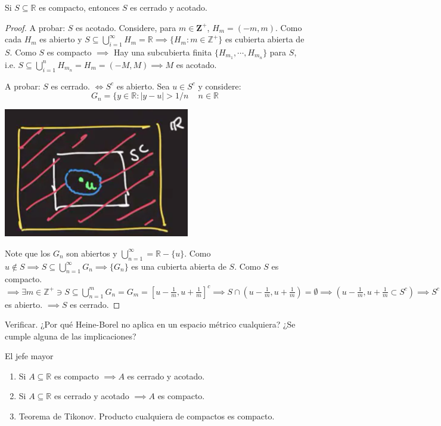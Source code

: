 \begin{teorema}
	Si $S\subseteq \mathbb{R}$ es compacto, entonces $S$ es cerrado y acotado. 
	\begin{proof}
		A probar: $S$ es acotado. Considere, para $m\in \mathbf{Z}^+$, $H_m=(-m,m)$. Como cada $H_m$ es abierto y $S\subseteq \bigcup_{i=1}^\infty H_m=\mathbb{R}\implies \{H_m:m\in\mathbb{Z}^+\}$ es cubierta abierta de $S$. Como $S$ es compacto $\implies$ Hay una subcubierta finita $\{H_{m_1},\cdots, H_{m_n}\}$ para $S$, i.e. $S\subseteq \bigcup_{i=1}^n H_{m_n}=H_m=(-M,M)\implies M$ es acotado. \newline 
		
		A probar: $S$ es cerrado. $\iff S^c$ es abierto. Sea $u\in S^c$ y considere:
	$$G_n=\{y\in\mathbb{R}: |y-u|>1/n\, \quad n\in \mathbb{R}$$
	\begin{center}
	\includegraphics[scale=0.6]{images/2/27}
\end{center}
Note que los $G_n$ son abiertos y $\bigcup_{n=1}^\infty =\mathbb{R}-\{u\}$. Como $u\not\in S\implies S\subseteq \bigcup_{n=1}^{\infty} G_n\implies \{G_n\}$ es una cubierta abierta de $S$. Como $S$ es compacto. $\implies \exists m\in \mathbb{Z}^+\ni S\subseteq \bigcup_{n=1}^m G_n=G_m=\left[u-\frac{1}{m}, u+\frac{1}{m}\right]^c\implies S\cap \left(u-\frac{1}{m}, u+\frac{1}{m}\right)=\emptyset\implies \left(u-\frac{1}{m}, u+\frac{1}{m}\subset S^c\right)\implies S^c$ es abierto. $\implies S$ es cerrado. 
	\end{proof}
\end{teorema}

\begin{cajita}{Verificar.}
	¿Por qué Heine-Borel no aplica en un espacio métrico cualquiera? ¿Se cumple alguna de las implicaciones?
\end{cajita}

\begin{teorema} El jefe mayor
	\begin{enumerate}
		\item Si $A\subseteq \mathbb{R}$ es compacto $\implies A$ es cerrado y acotado. 
		\item Si $A\subseteq \mathbb{R}$ es cerrado y acotado $\implies A$ es compacto. 
		\item Teorema de Tikonov. Producto cualquiera de compactos es compacto. 
	\end{enumerate}
\end{teorema}

